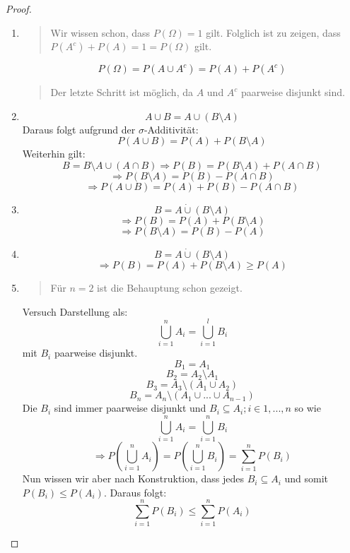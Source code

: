 \begin{proof}

 \begin{enumerate}
  \item 
\begin{quote}
 Wir wissen schon, dass $P(\Omega) = 1$ gilt. Folglich ist zu zeigen, dass $ P(A^c) + P(A) = 1 = P(\Omega)$ gilt.
\end{quote}
\begin{equation}
 P(\Omega)
 = P(A \cup A^c)
 = P(A) + P(A^c)
\end{equation}
\begin{quote}
 Der letzte Schritt ist möglich, da $A$ und $A^c$ paarweise disjunkt sind.
\end{quote}
  \item
$$ A \cup B = A \cup ( B \setminus A ) $$%
Daraus folgt aufgrund der $\sigma$-Additivität:%
$$ P(A \cup B) = P(A) + P( B \setminus A ) $$%
Weiterhin gilt:%
$$ B = B \setminus A \cup (A \cap B) \Rightarrow P(B) = P(B \setminus A) + P(A \cap B)$$
$$ \Rightarrow P(B \setminus A) = P(B) - P(A \cap B) $$
$$ \Rightarrow P(A \cup B) = P(A) + P(B) - P(A \cap B) $$
  \item
$$ B = A \dot{\cup} (B \setminus A) $$
$$ \Rightarrow P(B) = P(A) + P(B \setminus A) $$
$$ \Rightarrow P(B \setminus A) =  P(B) - P(A) $$
  \item 
$$ B = A \dot{\cup} (B \setminus A) $$
$$ \Rightarrow P(B) = P(A) + P(B \setminus A) \geq P(A) $$
  \item
\begin{quote}
 Für $n=2$ ist die Behauptung schon gezeigt.
\end{quote}
Versuch Darstellung als:
$$ \bigcup_{i=1}^n A_i =  \bigcup_{i=1}^l B_i $$
mit $B_i$ paarweise disjunkt.
$$ B_1 = A_1 $$
$$ B_2 = A_2 \setminus A_1 $$
$$ B_3 = A_3 \setminus ( A_1 \cup A_2) $$
$$ B_n = A_n \setminus ( A_1 \cup ... \cup A_{n-1} ) $$
Die $B_i$ sind immer paarweise disjunkt und $B_i \subseteq A_i ; i \in 1,...,n$ so wie
$$ \bigcup_{i=1}^n A_i =  \bigcup_{i=1}^n B_i $$
$$ \Rightarrow P \left ( \bigcup_{i=1}^n A_i \right ) = P \left ( \bigcup_{i=1}^n B_i \right ) = \sum_{i=1}^n P(B_i) $$
Nun wissen wir aber nach Konstruktion, dass jedes $B_i \subseteq A_i$ und somit $P(B_i) \leq P(A_i)$.
Daraus folgt:
$$ \sum_{i=1}^n P(B_i) \leq \sum_{i=1}^n P(A_i) $$
 \end{enumerate}
\end{proof}

